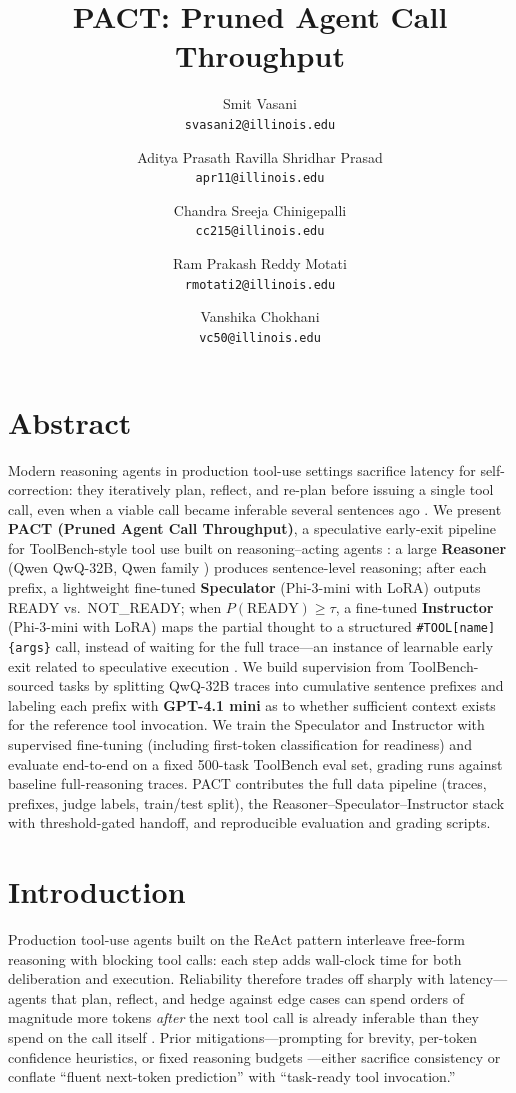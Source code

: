 \documentclass[letterpaper,twocolumn,10pt]{article}
\title{PACT: Pruned Agent Call Throughput}
\author{
Smit Vasani\\
\texttt{svasani2@illinois.edu}
\and
Aditya Prasath Ravilla Shridhar Prasad\\
\texttt{apr11@illinois.edu}
\and
Chandra Sreeja Chinigepalli\\
\texttt{cc215@illinois.edu}
\and
Ram Prakash Reddy Motati\\
\texttt{rmotati2@illinois.edu}
\and
Vanshika Chokhani\\
\texttt{vc50@illinois.edu}
}
\begin{document}
\maketitle

\section{Abstract}
Modern reasoning agents in production tool-use settings sacrifice latency for self-correction: they iteratively plan, reflect, and re-plan before issuing a single tool call, even when a viable call became inferable several sentences ago \cite{overthinking2025,masterman2025ai}. We present \textbf{PACT (Pruned Agent Call Throughput)}, a speculative early-exit pipeline for ToolBench-style tool use \cite{qin2023toolbench} built on reasoning--acting agents \cite{yao2022react}: a large \textbf{Reasoner} (Qwen QwQ-32B, Qwen family \cite{qwen3}) produces sentence-level reasoning; after each prefix, a lightweight fine-tuned \textbf{Speculator} (Phi-3-mini with LoRA) outputs READY vs.\ NOT\_READY; when $P(\text{READY})\ge \tau$, a fine-tuned \textbf{Instructor} (Phi-3-mini with LoRA) maps the partial thought to a structured \texttt{\#TOOL[name]\{args\}} call, instead of waiting for the full trace---an instance of learnable early exit related to speculative execution \cite{leviathan2023fast,pan2025specreason}. We build supervision from ToolBench-sourced tasks by splitting QwQ-32B traces into cumulative sentence prefixes and labeling each prefix with \textbf{GPT-4.1 mini} as to whether sufficient context exists for the reference tool invocation. We train the Speculator and Instructor with supervised fine-tuning (including first-token classification for readiness) and evaluate end-to-end on a fixed 500-task ToolBench eval set, grading runs against baseline full-reasoning traces. PACT contributes the full data pipeline (traces, prefixes, judge labels, train/test split), the Reasoner--Speculator--Instructor stack with threshold-gated handoff, and reproducible evaluation and grading scripts.

\section{Introduction}

Production tool-use agents built on the ReAct pattern \cite{yao2022react} interleave free-form reasoning with blocking tool calls: each step adds wall-clock time for both deliberation and execution. Reliability therefore trades off sharply with latency---agents that plan, reflect, and hedge against edge cases can spend orders of magnitude more tokens \emph{after} the next tool call is already inferable than they spend on the call itself \cite{overthinking2025}. Prior mitigations---prompting for brevity, per-token confidence heuristics, or fixed reasoning budgets \cite{qwen3,han2024tokenbudget}---either sacrifice consistency or conflate ``fluent next-token prediction'' with ``task-ready tool invocation.''
\end{document}
